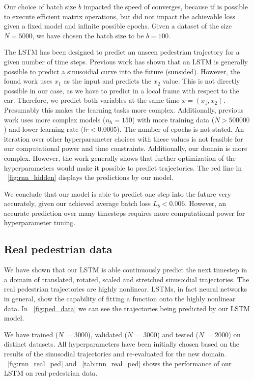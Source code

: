 Our choice of batch size $b$ impacted the speed of converges, because tf is possible to execute efficient matrix operations, but did not impact the achievable loss given a fixed model and infinite possible epochs. Given a dataset of the size $N=5000$, we have chosen the batch size to be $b=100$.

The LSTM has been designed to predict an unseen pedestrian trajectory for a given number of time steps. Previous work has shown that an LSTM is generally possible to predict a sinusoidial curve into the future (sunsided). However, the found work uses $x_1$ as the input and predicts the $x_2$ value. This is not directly possible in our case, as we have to predict in a local frame with respect to the car. Therefore, we predict both variables at the same time $x = (x_1, x_2)$. Presumably this makes the learning tasks more complex. Additionally, previous work uses more complex models ($n_h=150$) with more training data ($N>500000$) and lower learning rate ($lr<0.0005$). The number of epochs is not stated. An iteration over other hyperparameter choices with these values is not feasible for our computational power and time constraints. Additionally, our domain is more complex. However, the work generally shows that further optimization of the hyperparameters would make it possible to predict trajectories. The red line in ~\cref{fig:rnn_hidden} displays the predictions by our model. 

We conclude that our model is able to predict one step into the future very accurately, given our achieved average batch loss $L_b<0.006$. However, an accurate prediction over many timesteps requires more computational power for hyperparameter tuning. 

\subsection{Real pedestrian data}

We have shown that our LSTM is able continuously predict the next timestep in a domain of translated, rotated, scaled and stretched sinusoidial trajectories. The real pedestrian trajectories are highly nonlinear. LSTMs, in fact neural networks in general, show the capability of fitting a function onto the highly nonlinear data. In ~\cref{fig:ped_data} we can see the trajectories being predicted by our LSTM model.

We have trained ($N~=3000$), validated ($N~=3000$) and tested ($N~=2000$) on distinct datasets. All hyperparameters have been initially chosen based on the results of the sinusodial trajectories and re-evaluated for the new domain. ~\cref{fig:rnn_real_ped} and ~\cref{tab:rnn_real_ped} shows the performance of our LSTM on real pedestrian data. 
 
